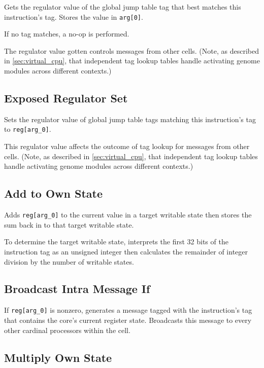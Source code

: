 Gets the regulator value of the global jump table tag that best matches this instruction's tag.
Stores the value in \texttt{arg[0]}.

If no tag matches, a no-op is performed.

The regulator value gotten controls messages from other cells.
(Note, as described in \ref{sec:virtual_cpu}, that independent tag lookup tables handle activating genome modules across different contexts.)

\subsection{Exposed Regulator Set}


Sets the regulator value of global jump table tags matching this instruction's tag to \texttt{reg[arg\_0]}.

This regulator value affects the outcome of tag lookup for messages from other cells.
(Note, as described in \ref{sec:virtual_cpu}, that independent tag lookup tables handle activating genome modules across different contexts.)

\subsection{Add to Own State}


Adds \texttt{reg[arg\_0]} to the current value in a target writable state then stores the sum back in to that target writable state.

To determine the target writable state, interprets the first 32 bits of the instruction tag as an unsigned integer then calculates the remainder of integer division by the number of writable states.

\subsection{Broadcast Intra Message If}


If \texttt{reg[arg\_0]} is nonzero, generates a message tagged with the instruction's tag that contains the core's current register state.
Broadcasts this message to every other cardinal processors within the cell.

\subsection{Multiply Own State}

